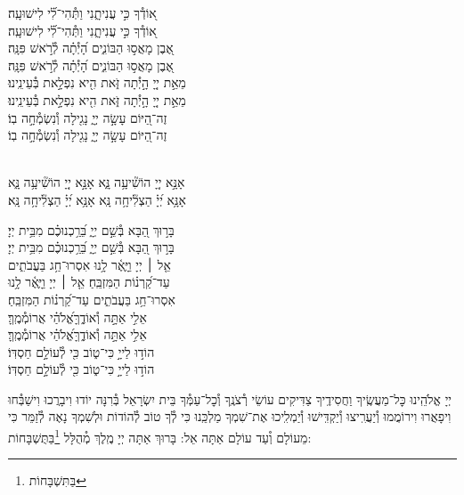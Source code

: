 \documentclass[twoside, openany, parskip=half, 11pt]{book}
\begin{document}
{\begin{narrow}
א֭וֹדְ֯ךָ כִּ֣י עֲנִיתָ֑נִי \hfill וַתְּ֯הִי־לִ֗֝י לִישׁוּעָֽה׃ \\
\scriptsize{ א֭וֹדְ֯ךָ כִּ֣י עֲנִיתָ֑נִי \hfill וַתְּ֯הִי־לִ֗֝י לִישׁוּעָֽה׃ \\}\normalsize{}
אֶ֭בֶן מָאֲס֣וּ הַבּוֹנִ֑ים \hfill הָ֝יְ֯תָ֗ה לְ֯רֹ֣אשׁ פִּנָּֽה׃ \\
\scriptsize{ אֶ֭בֶן מָאֲס֣וּ הַבּוֹנִ֑ים \hfill הָ֝יְ֯תָ֗ה לְ֯רֹ֣אשׁ פִּנָּֽה׃ \\}\normalsize{}
מֵאֵ֣ת יְיָ֭ הָ֣יְ֯תָה זֹּ֑את \hfill הִ֖יא נִפְלָ֣את בְּ֯עֵינֵֽינוּ׃ \\
\scriptsize{ מֵאֵ֣ת יְיָ֭ הָ֣יְ֯תָה זֹּ֑את \hfill הִ֖יא נִפְלָ֣את בְּ֯עֵינֵֽינוּ׃ \\}\normalsize{}
זֶה־הַ֭יּוֹם עָשָׂ֣ה יְיָ֑ \hfill נָגִ֖ילָה וְ֯נִשְׂמְ֯חָ֣ה בֽוֹ׃ \\
\scriptsize{ זֶה־הַ֭יּוֹם עָשָׂ֣ה יְיָ֑ \hfill נָגִ֖ילָה וְ֯נִשְׂמְ֯חָ֣ה בֽוֹ׃ } \normalsize{}


\\
אָנָּ֣א יְיָ֭ הוֹשִׁ֘יעָ֥ה נָּ֑א \hfill \scriptsize{אָנָּ֣א יְיָ֭ הוֹשִׁ֘יעָ֥ה נָּ֑א}\\ \normalsize
אָנָּ֥א יְ֝יָ֗ הַצְלִ֘יחָ֥ה נָּֽא \hfill \scriptsize{ אָנָּ֥א יְ֝יָ֗ הַצְלִ֘יחָ֥ה נָּֽא׃}\\ \normalsize


בָּר֣וּךְ הַ֭בָּא בְּ֯שֵׁ֣ם יְיָ֑ \hfill בֵּ֝רַ֥כְנוּכֶ֗ם מִבֵּ֥ית יְיָ׃\\
\scriptsize{בָּר֣וּךְ הַ֭בָּא בְּ֯שֵׁ֣ם יְיָ֑ \hfill בֵּ֝רַ֥כְנוּכֶ֗ם מִבֵּ֥ית יְיָ׃}\\
\normalsize{אֵ֤ל ׀ יְיָ וַיָּ֢אֶ֫ר לָ֥נוּ \hfill אִסְרוּ־חַ֥ג בַּעֲבֹתִ֑ים \\ עַד־קַ֝רְנ֗וֹת הַמִּזְבֵּֽחַ׃ \hfill }
\scriptsize{אֵ֤ל ׀ יְיָ וַיָּ֢אֶ֫ר לָ֥נוּ \\ אִסְרוּ־חַ֥ג בַּעֲבֹתִ֑ים \hfill עַד־קַ֝רְנ֗וֹת הַמִּזְבֵּֽחַ׃}\\
\normalsize{אֵלִ֣י אַתָּ֣ה וְ֯אוֹדֶ֑ךָּ\hfill אֱ֝לֹהַ֗י אֲרוֹמְ֯מֶֽךָּ׃}\\
\scriptsize{אֵלִ֣י אַתָּ֣ה וְ֯אוֹדֶ֑ךָּ\hfill אֱ֝לֹהַ֗י אֲרוֹמְ֯מֶֽךָּ׃}\\
\normalsize{הוֹד֣וּ לַייָ֣ כִּי־ט֑וֹב \hfill כִּ֖י לְ֯עוֹלָ֣ם חַסְדּֽוֹ׃ }\\
\scriptsize{הוֹד֣וּ לַייָ֣ כִּי־ט֑וֹב \hfill כִּ֖י לְ֯עוֹלָ֣ם חַסְדּֽוֹ׃ } \\
\normalsize{}

\end{narrow}

\negline

יְיָ אֱלֹהֵֽינוּ כׇּל־מַעֲשֶֽׂיךָ וַחֲסִידֶֽיךָ צַדִּיקִים עוֹשֵׂי רְ֯צֹנֶֽךָ וְ֯כׇל־עַמְּ֯ךָ בֵּית יִשְׂרָאֵל בְּ֯רִנָּה יוֹדוּ וִיבָרֲכוּ וִישַׁבְּ֯חוּ וִיפָאֲרוּ וִירוֹמֲמוּ וְ֯יַעֲרִֽיצוּ וְ֯יַקְדִּֽישׁוּ וְ֯יַמְלִֽיכוּ אֶת־שִׁמְךָ מַלְכֵּֽנוּ כִּי לְ֯ךָ טוֹב לְ֯הוֹדוֹת וּלְשִׁמְךָ נָאֶה לְ֯זַמֵּר כִּי מֵעוֹלָם וְ֯עַד עוֹלָם אַתָּה אֵל: בָּרוּךְ אַתָּה יְיָ מֶֽלֶךְ מְ֯הֻלָּל \footnote{בַּתִּשְׁבָּחוֹת}בַּתֻּשְׁבָּחוֹת:
}
\end{document}
